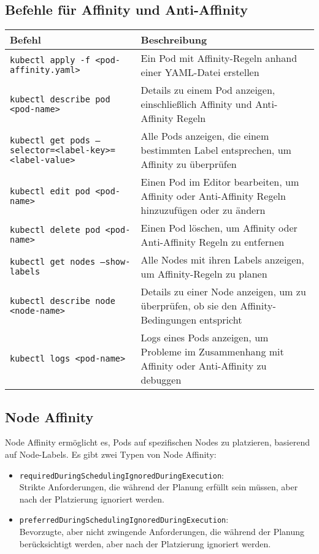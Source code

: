 \subsection{Befehle für Affinity und Anti-Affinity}
\begin{tabular}{|p{}|p{}|}
\hline
\textbf{Befehl} & \textbf{Beschreibung} \\
\hline
\texttt{kubectl apply -f <pod-affinity.yaml>} & Ein Pod mit Affinity-Regeln anhand einer YAML-Datei erstellen \\
\texttt{kubectl describe pod <pod-name>} & Details zu einem Pod anzeigen, einschließlich Affinity und Anti-Affinity Regeln \\
\texttt{kubectl get pods --selector=<label-key>=<label-value>} & Alle Pods anzeigen, die einem bestimmten Label entsprechen, um Affinity zu überprüfen \\
\texttt{kubectl edit pod <pod-name>} & Einen Pod im Editor bearbeiten, um Affinity oder Anti-Affinity Regeln hinzuzufügen oder zu ändern \\
\texttt{kubectl delete pod <pod-name>} & Einen Pod löschen, um Affinity oder Anti-Affinity Regeln zu entfernen \\
\texttt{kubectl get nodes --show-labels} & Alle Nodes mit ihren Labels anzeigen, um Affinity-Regeln zu planen \\
\texttt{kubectl describe node <node-name>} & Details zu einer Node anzeigen, um zu überprüfen, ob sie den Affinity-Bedingungen entspricht \\
\texttt{kubectl logs <pod-name>} & Logs eines Pods anzeigen, um Probleme im Zusammenhang mit Affinity oder Anti-Affinity zu debuggen \\
\hline
\end{tabular}
\newpage
\subsection{Node Affinity}
Node Affinity ermöglicht es, Pods auf spezifischen Nodes zu platzieren, basierend auf Node-Labels. Es gibt zwei Typen von Node Affinity:
\begin{itemize}
    \item \texttt{requiredDuringSchedulingIgnoredDuringExecution}:\\
    Strikte Anforderungen, die während der Planung erfüllt sein müssen, aber nach der Platzierung ignoriert werden.
    \item \texttt{preferredDuringSchedulingIgnoredDuringExecution}:\\
    Bevorzugte, aber nicht zwingende Anforderungen, die während der Planung berücksichtigt werden, aber nach der Platzierung ignoriert werden.
\end{itemize}

